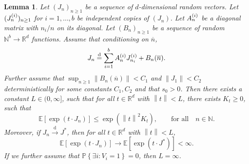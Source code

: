 \documentclass[11pt]{article}
\newcommand{\E}[1]{\mathbb{E} \left[#1\right]}
\newcommand{\norm}[1]{\left\lVert#1\right\rVert}
\def\R{\mathbb{R}}
\def\N{\mathbb{N}}
\newcommand\Prob[1]{{\mathbb{P}\left\{#1\right\}}}
\numberwithin{theorem}{section}
\newtheorem{lemma}[theorem]{Lemma}
\theoremstyle{definition}
\newcommand{\inlaw}{\dto}%
\newcommand{\eql}{\eqdd}%
\newcommand{\nBar}{\overline{n}}
\numberwithin{equation}{section}
\newcommand{\too}{\longrightarrow}
\newcommand\dto{\overset{\mathrm{d}}{\too}}
\newcommand\eqdd{\overset{\mathrm{d}}{=}}
\begin{document}
\begin{lemma}\label{lem:mgf:J}
Let \((J_{n})_{n \ge 1}\) be a sequence of \(d\)-dimensional random vectors.
    Let \((J_{n}^{(i)})_{n \ge 1}\) for \(i = 1,\dots,b\) be independent copies of \( (J_{n})\).
    Let \(A_{n}^{(i)}\) be a diagonal matrix with \(n_i/n\) on its diagonal.
    Let \( (B_{n})_{n \ge 1}\) be a sequence of random \(\N^{b} \to \R^{d}\) functions.
    Assume that conditioning on \(\nBar\),
    \begin{equation}
        J_{n} \eql \sum_{i=1}^{b} \Ain \Jini + B_{n}(\nBar).
        \label{eq:J:rec}
    \end{equation}
    Further assume that \(\sup_{n \ge 1} \norm{B_n(\nBar)} < C_1\) and \(\norm{J_{1}} < C_2\) deterministically for some
    constants \(C_1, C_2\) and that \(s_0 > 0\).
    Then there exists a constant \(L \in (0, \infty]\), such that
    for all \(t \in \R^d\) with \(\norm{t}<L\),
    there exists \(K_t \ge 0\), such that
    \begin{equation}
    \E{\exp(t\cdot J_{n})} \leq \exp( \norm{t}^2 K_t),
    \qquad
    \text{for all} 
    \quad
    n \in \N 
    .
    \label{eq:J:mgf}
    \end{equation}
    Moreover, if \(J_{n} \inlaw J^{*}\), then for all \(t \in \R^{d}\) with \(\norm{t} < L\),
    \begin{equation}\label{eq:J:mgf:converge}
        \E{\exp\left(t \cdot J_{n}\right)}
        \to
        \E{\exp\left(t \cdot J^{*} \right)}
<\infty.
    \end{equation}
If we further assume that \(\Prob{\exists i:V_i=1}=0\), then \(L = \infty\).
\end{lemma}
\end{document}
